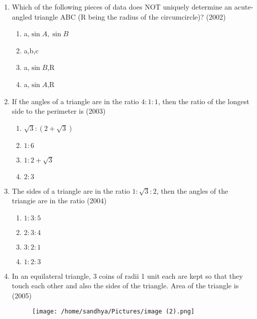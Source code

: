 \documentclass[12pt]{article}
\begin{document}
\begin{enumerate}
\item Which of the following pieces of data does NOT uniquely determine an acute-angled triangle ABC (R being the radius of the circumcircle)? (2002)
\begin{enumerate}
\item a,$\sin A,\sin B$
\item a,b,c
\item a,$\sin B$,R
\item a,$\sin A$,R
\end{enumerate}
\item If the angles of a triangle are in the ratio $4:1:1$, then the ratio of the longest side to the perimeter is (2003)
\begin{enumerate}
\item $\sqrt{3}:(2+\sqrt{3})$
\item $1:6$
\item $1:2+\sqrt{3}$
\item $2:3$
\end{enumerate}
\item The sides of a triangle are in the ratio $1:\sqrt{3}:2$, then the angles of the triangie are in the ratio (2004)
\begin{enumerate}
\item $1:3:5$
\item $2:3:4$
\item $3:2:1$
\item $1:2:3$
\end{enumerate}
\item In an equilateral triangle, 3 coins of radii 1 unit each are kept so that they touch each other and also the sides of the triangle. Area of the triangle is  (2005)
\pagebreak
\begin{figure}[!h]
\centering
  \texttt{[image: /home/sandhya/Pictures/image (2).png]}
 \caption{}
 \label{}
 \end{figure}


\end{enumerate}
\end{document}
